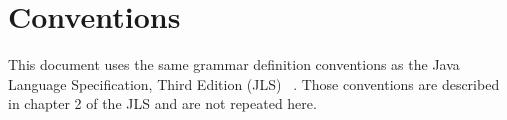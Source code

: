 \section{Conventions}

This document uses the same grammar definition conventions as the Java
Language Specification, Third Edition (JLS) ~\cite{gosling2005}.  Those conventions
are described in chapter 2 of the JLS and are not repeated here.


